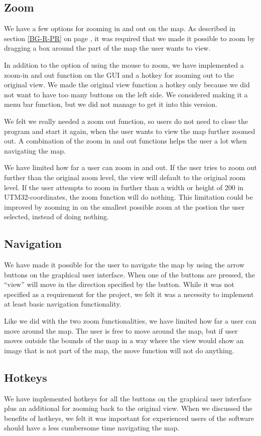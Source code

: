 \subsection{Zoom}
\label{UIA-IF-Z}
We have a few options for zooming in and out on the map. As described in
section \ref{BG-R-PR}  on page \pageref{BG-R-PR}, it
was required that we made it possible to zoom by dragging a box around the part of the map the user wants to
view.

In addition to the option of using the mouse to zoom, we have implemented a
zoom-in and out function on the GUI and a hotkey for zooming out to the original
view. We made the original view function a hotkey only because we did not want
to have too many buttons on the left side. We considered making it a menu bar
function, but we did not manage to get it into this version.

We felt we really needed a zoom out function, so users do not need to close the
program and start it again, when the user wants to view the map further zoomed
out. A combination of the zoom in and out functions helps the user a lot when
navigating the map.

We have limited how far a user can zoom in and out. If the user tries to zoom
out further than the original zoom level, the view will default to the original
zoom level. If the user attempts to zoom in further than a width or height of
200 in UTM32-coordinates, the zoom function will do nothing. This limitation
could be improved by zooming in on the smallest possible zoom at the postion the
user selected, instead of doing nothing.
\subsection{Navigation}
\label{UIA-IF-N}
We have made it possible for the user to navigate the map by using the arrow
buttons on the graphical user interface. When one of the buttons are pressed,
the ``view'' will move in the direction specified by the button. While it was
not specified as a requirement for the project, we felt it was a necessity to
implement at least basic navigation functionality.

Like we did with the two zoom functionalities, we have limited how far a user
can move around the map. The user is free to move around the map, but if user
moves outside the bounds of the map in a way where the view would show an image
that is not part of the map, the move function will not do anything.
\subsection{Hotkeys}
\label{UIA-IF-H}
We have implemented hotkeys for all the buttons on the graphical user interface
plus an additional for zooming back to the original view. When we discussed the
benefits of hotkeys, we felt it was important for experienced users of the
software should have a less cumbersome time navigating the map. 

